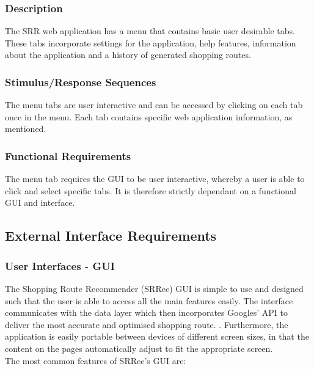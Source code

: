 \documentclass[10pt, a4paper, onecolumn]{scrartcl}
\begin{document}
			\subsubsection*{Description}
			
				The SRR web application has a menu that contains basic user desirable tabs. These tabs incorporate settings for the application, help features, information about the application and a history of generated shopping routes. 
			
			\subsubsection*{Stimulus/Response Sequences}
			
				The menu tabs are user interactive and can be accessed by clicking on each tab once in the menu. Each tab contains specific web application information, as mentioned. 
			
			\subsubsection*{Functional Requirements}
			
				The menu tab requires the GUI to be user interactive, whereby a user is able to click and select specific tabs. It is therefore strictly dependant on a functional GUI and interface.
				
	
	\subsection{External Interface Requirements}
	
		\subsubsection{User Interfaces - GUI}
		
				The Shopping Route Recommender (SRRec) GUI is simple to use and designed such that the user is able to access all the main features easily. The interface communicates with the data layer which then incorporates Googles' API to deliver the most accurate and optimised shopping route. . Furthermore, the application is easily portable between devices of different screen sizes, in that the content on the pages automatically adjust to fit the appropriate screen.\\
				
				The most common features of SRRec's GUI are:
				
\end{document}
